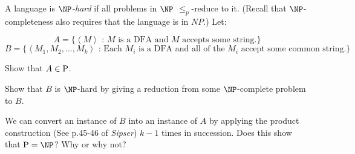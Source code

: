 \documentclass[solution, letterpaper]{cs121}
\begin{document}
       

 A language is {\em $\NP$-hard} if all
problems in $\NP$ $\le_p$-reduce to it. (Recall that $\NP$-completeness also requires that the language is in $NP$.) Let:

$$A=\{\left<M\right>\text{ : $M$ is a DFA and $M$ accepts some string.}\}$$
$$B=\{\left<M_1,M_2,...,M_k\right>\text{ : Each $M_i$ is a DFA and
all of the $M_i$ accept some common string.} \}$$

\subproblem Show that $A \in \P$.

\subproblem Show that $B$ is $\NP$-hard by giving a reduction from
some $\NP$-complete problem to $B$.

\subproblem We can convert an instance of $B$ into an instance of
$A$ by applying the product construction (See p.45-46 of {\em
Sipser}) $k-1$ times in succession. Does this show that $\P=\NP$? Why
or why not?
\end{document}

